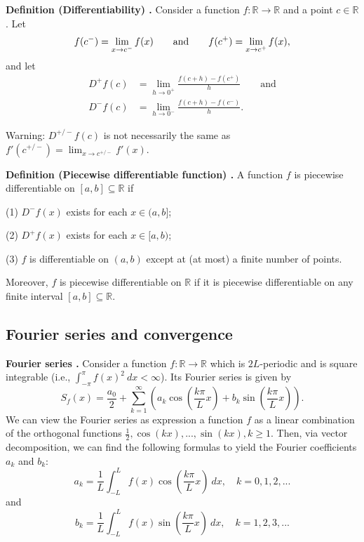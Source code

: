 \begin{shaded}
\textbf{Definition (Differentiability) \cite{math2111_notes}.} Consider a function $ f : \mathbb{R} \to \mathbb{R} $ and a point $c \in \mathbb{R}$. Let
$$ f(c^-) = \lim_{x \to c^-} f(x) \qquad \textnormal{and} \qquad f(c^+) = \lim_{x \to c^+} f(x) , $$
and let
\begin{align*}
	D^+ f(c) &= \lim_{h \to 0^+} \frac{f(c + h) - f(c^+)}{h} \qquad \text{and} \\
	D^- f(c) &= \lim_{h \to 0^-} \frac{f(c + h) - f(c^-)}{h} .
\end{align*}

Warning: $D^{+/-} f(c)$ is not necessarily the same as $f'(c^{+/-}) = \lim_{x \to c^{+/-}} f'(x)$.
\end{shaded}

\begin{shaded}
\textbf{Definition (Piecewise differentiable function) \cite{math2111_notes}.} A function $f$ is piecewise differentiable on $[a, b] \subseteq \mathbb{R}$ if

(1) $D^- f(x)$ exists for each $x \in (a, b]$;

(2) $D^+ f(x)$ exists for each $x \in [a, b)$;

(3) $f$ is differentiable on $(a, b)$ except at (at most) a finite number of points.

Moreover, $f$ is piecewise differentiable on $\mathbb{R}$ if it is piecewise differentiable on any finite interval $[a, b] \subseteq \mathbb{R}$.
\end{shaded}

\subsection{Fourier series and convergence}

\begin{shaded}
\textbf{Fourier series \cite{math2111_notes}.} Consider a function $f : \mathbb{R} \to \mathbb{R}$ which is $2 L$-periodic and is square integrable (i.e., $\int_{-\pi}^\pi f(x)^2 \ dx < \infty $). Its Fourier series is given by
$$ S_f(x) = \frac{a_0}{2} + \sum_{k = 1}^{\infty} \left( a_k \cos \left( \frac{k \pi}{L}x \right) + b_k \sin \left( \frac{k \pi}{L}x \right) \right) . $$
We can view the Fourier series as expression a function $f$ as a linear combination of the orthogonal functions $\frac{1}{2}, \cos(kx), ..., \sin(kx), k \geq 1$. Then, via vector decomposition, we can find the following formulas to yield the Fourier coefficients $a_k$ and $b_k$:
$$ a _k = \frac{1}{L} \int_{-L}^L f(x) \cos \left( \frac{k \pi}{L}x \right) \ dx, \quad k = 0, 1, 2, ... $$
and
$$ b _k = \frac{1}{L} \int_{-L}^L f(x) \sin \left( \frac{k \pi}{L}x \right) \ dx, \quad k = 1, 2, 3, ... $$
\end{shaded}

